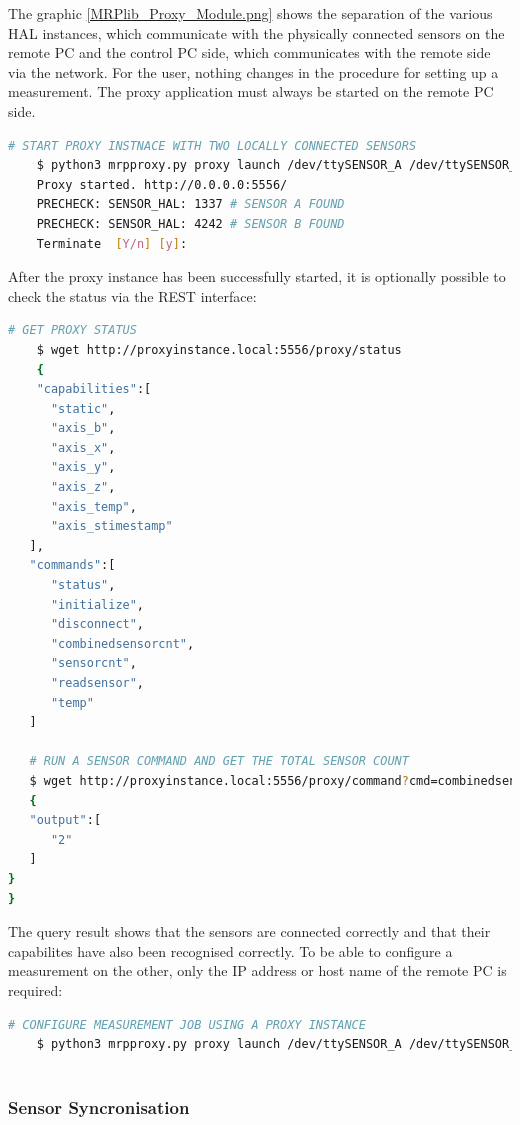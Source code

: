 The graphic \ref{MRPlib_Proxy_Module.png} shows the separation of the
various HAL instances, which communicate with the physically connected
sensors on the remote PC and the control PC side, which communicates
with the remote side via the network. For the user, nothing changes in
the procedure for setting up a measurement. The proxy application must
always be started on the remote PC side.

\begin{lstlisting}[language=bash]
    # START PROXY INSTNACE WITH TWO LOCALLY CONNECTED SENSORS
    $ python3 mrpproxy.py proxy launch /dev/ttySENSOR_A /dev/ttySENSOR_B # add another proxy instance http://proxyinstance_2.local for multi-sensor, multi-proxy chain
    Proxy started. http://0.0.0.0:5556/
    PRECHECK: SENSOR_HAL: 1337 # SENSOR A FOUND
    PRECHECK: SENSOR_HAL: 4242 # SENSOR B FOUND
    Terminate  [Y/n] [y]: 
\end{lstlisting}

After the proxy instance has been successfully started, it is optionally
possible to check the status via the REST interface:

\begin{lstlisting}[language=bash]
    # GET PROXY STATUS
    $ wget http://proxyinstance.local:5556/proxy/status
    {
    "capabilities":[
      "static",
      "axis_b",
      "axis_x",
      "axis_y",
      "axis_z",
      "axis_temp",
      "axis_stimestamp"
   ],
   "commands":[
      "status",
      "initialize",
      "disconnect",
      "combinedsensorcnt",
      "sensorcnt",
      "readsensor",
      "temp"
   ]

   # RUN A SENSOR COMMAND AND GET THE TOTAL SENSOR COUNT
   $ wget http://proxyinstance.local:5556/proxy/command?cmd=combinedsensorcnt
   {
   "output":[
      "2"
   ]
}
}
\end{lstlisting}

The query result shows that the sensors are connected correctly and that
their capabilites have also been recognised correctly. To be able to
configure a measurement on the other, only the IP address or host name
of the remote PC is required:

\begin{lstlisting}[language=bash]
    # CONFIGURE MEASUREMENT JOB USING A PROXY INSTANCE
    $ python3 mrpproxy.py proxy launch /dev/ttySENSOR_A /dev/ttySENSOR_B
    
\end{lstlisting}

\hypertarget{sensor-syncronisation}{%
\subsubsection{Sensor Syncronisation}\label{sensor-syncronisation}}

